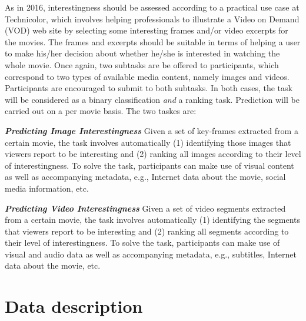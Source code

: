 \documentclass[sigconf]{acmart-me}
\begin{document}
As in 2016, interestingness should be assessed according to a practical use case at Technicolor, which involves helping professionals to illustrate a Video on Demand (VOD) web site by selecting some interesting frames and/or video excerpts for the movies. The frames and excerpts should be suitable in terms of helping a user to make his/her decision about whether he/she is interested in watching the whole movie.
Once again, two subtasks are be offered to participants, which correspond to two types of available media content, namely images and videos. Participants are encouraged to submit to both subtasks. In both cases, the task will be considered as a binary classification \emph{and} a ranking task. Prediction will be carried out on a per movie basis.
The two taskes are:

\emph{\bf Predicting Image Interestingness} Given a set of key-frames extracted from a certain movie, the task involves automatically (1) identifying those images that viewers report to be interesting and (2) ranking all images according to their level of interestingness. To solve the task, participants can make use of visual content as well as accompanying metadata, e.g., Internet data about the movie, social media information, etc.

\emph{\bf Predicting Video Interestingness} Given a set of video segments extracted from a certain movie, the task involves automatically (1) identifying the segments that viewers report to be interesting and (2) ranking all segments according to their level of interestingness. To solve the task, participants can make use of visual and audio data as well as accompanying metadata, e.g., subtitles, Internet data about the movie, etc.

\vspace{-0.2cm}
\section{Data description}
\end{document}
